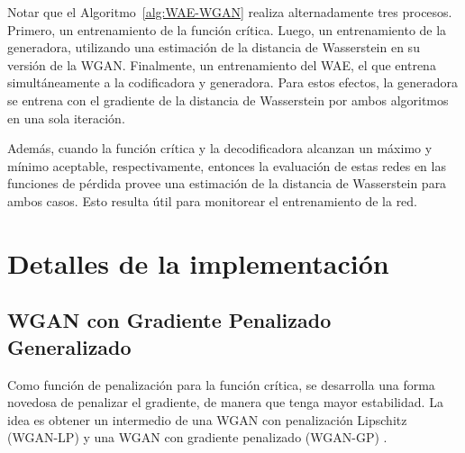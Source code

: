 Notar que el Algoritmo~\ref{alg:WAE-WGAN} realiza alternadamente tres procesos. Primero, un entrenamiento de la función crítica. Luego, un entrenamiento de la generadora, utilizando una estimación de la distancia de Wasserstein en su versión de la WGAN. Finalmente, un entrenamiento del WAE, el que entrena simultáneamente a la codificadora y generadora. Para estos efectos, la generadora se entrena con el gradiente de la distancia de Wasserstein por ambos algoritmos en una sola iteración.


Además, cuando la función crítica y la decodificadora alcanzan un máximo y mínimo aceptable, respectivamente, entonces la evaluación de estas redes en las funciones de pérdida provee una estimación de la distancia de Wasserstein para ambos casos. Esto resulta útil para monitorear el entrenamiento de la red.

\section{Detalles de la implementación}\label{sec:detalles-implementacion}  %

\subsection{WGAN con Gradiente Penalizado Generalizado}\label{ssec:wgan-ggp}  %


Como función de penalización para la función crítica, se desarrolla una forma novedosa de penalizar el gradiente, de manera que tenga mayor estabilidad. La idea es obtener un intermedio de una WGAN con penalización Lipschitz (WGAN-LP) \cite{zhou2018lp} y una WGAN con gradiente penalizado (WGAN-GP) \cite{gulrajani2017improved}.

